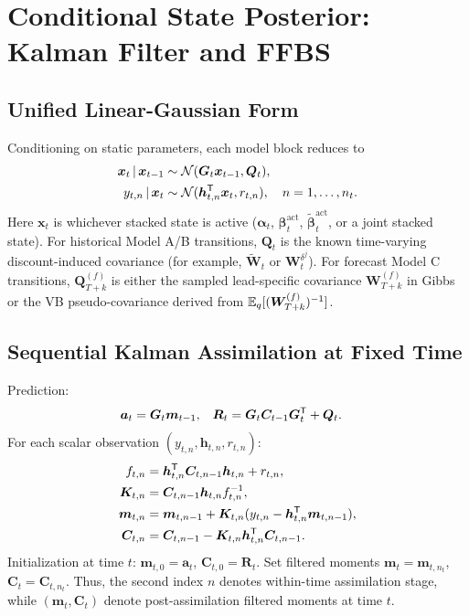 \section{Conditional State Posterior: Kalman Filter and FFBS}

\subsection{Unified Linear-Gaussian Form}
Conditioning on static parameters, each model block reduces to
\begin{align}
\bm x_t\,|\,\bm x_{t-1} &\sim \mathcal{N}(\bm G_t\bm x_{t-1},\bm Q_t), \label{eq:lgssm_state}\\
y_{t,n}\,|\,\bm x_t &\sim \mathcal{N}(\bm h_{t,n}^{\mathsf{T}}\bm x_t,r_{t,n}),\quad n=1,\dots,n_t. \label{eq:lgssm_obs}
\end{align}
Here $\bm x_t$ is whichever stacked state is active ($\bm\alpha_t$,
$\bm\beta_t^{\mathrm{act}}$, $\widetilde{\bm\beta}_t^{\mathrm{act}}$, or a joint stacked state).
For historical Model A/B transitions, $\bm Q_t$ is the known time-varying discount-induced
covariance (for example, $\tilde{\bm W}_t$ or $\bm W_t^{\delta^j}$). For forecast Model C
transitions, $\bm Q_{T+k}^{(f)}$ is either the sampled lead-specific covariance
$\bm W_{T+k}^{(f)}$ in Gibbs or the VB pseudo-covariance derived from
$\mathbb{E}_q[(\bm W_{T+k}^{(f)})^{-1}]$.

\subsection{Sequential Kalman Assimilation at Fixed Time}
Prediction:
\begin{align}
\bm a_t &= \bm G_t\bm m_{t-1},
& \bm R_t &= \bm G_t\bm C_{t-1}\bm G_t^{\mathsf{T}} + \bm Q_t.
\end{align}
For each scalar observation $(y_{t,n},\bm h_{t,n},r_{t,n})$:
\begin{align}
f_{t,n} &= \bm h_{t,n}^{\mathsf{T}} \bm C_{t,n-1}\bm h_{t,n}+r_{t,n}, \label{eq:kf_f}\\
\bm K_{t,n} &= \bm C_{t,n-1}\bm h_{t,n} f_{t,n}^{-1}, \label{eq:kf_K}\\
\bm m_{t,n} &= \bm m_{t,n-1}+\bm K_{t,n}(y_{t,n}-\bm h_{t,n}^{\mathsf{T}}\bm m_{t,n-1}), \label{eq:kf_m}\\
\bm C_{t,n} &= \bm C_{t,n-1}-\bm K_{t,n}\bm h_{t,n}^{\mathsf{T}}\bm C_{t,n-1}. \label{eq:kf_C}
\end{align}
Initialization at time $t$: $\bm m_{t,0}=\bm a_t$, $\bm C_{t,0}=\bm R_t$.
Set filtered moments $\bm m_t=\bm m_{t,n_t}$, $\bm C_t=\bm C_{t,n_t}$.
Thus, the second index $n$ denotes within-time assimilation stage, while
$(\bm m_t,\bm C_t)$ denote post-assimilation filtered moments at time $t$.

